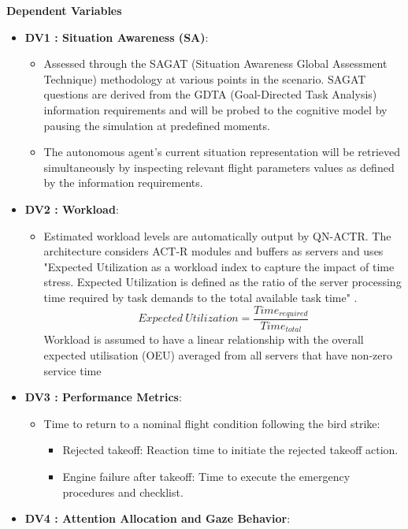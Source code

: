 \documentclass[12pt,a4paper]{article} %
\begin{document}
	\textbf{Dependent Variables}
	\begin{itemize}
	\item \textbf{DV1 : Situation Awareness (SA)}:
	\begin{itemize}
	\item Assessed through the SAGAT (Situation Awareness Global Assessment Technique) methodology at various points in the scenario.
	SAGAT questions are derived from the GDTA (Goal-Directed Task Analysis) information requirements and will be probed to the cognitive model by pausing the simulation at predefined moments.
	\item The autonomous agent's current situation representation will be retrieved simultaneously by inspecting relevant flight parameters values as defined by the information requirements.
	\end{itemize}
	\item \textbf{DV2 : Workload}:
	\begin{itemize}
	\item Estimated workload levels are automatically output by QN-ACTR. The architecture considers ACT-R modules and buffers as servers and uses "Expected Utilization as a workload index to capture the impact of time stress. Expected Utilization is defined as the ratio of the server processing time required by task demands to the total available task time" \parencite{cao_modelling_2015}.
	\begin{equation}
		Expected\ Utilization = \frac{Time_{required}}{Time_{total}} 
	\end{equation}
	Workload is assumed to have a linear relationship with the overall expected utilisation (OEU) averaged from all servers that have non-zero service time
	\end{itemize}
	\item \textbf{DV3 : Performance Metrics}:
	\begin{itemize}
	\item Time to return to a nominal flight condition following the bird strike:
	\begin{itemize}
	\item Rejected takeoff: Reaction time to initiate the rejected takeoff action.
	\item Engine failure after takeoff: Time to execute the emergency procedures and checklist.
	\end{itemize}
	\end{itemize}
	\item \textbf{DV4 : Attention Allocation and Gaze Behavior}:

\end{itemize}
\end{document}
